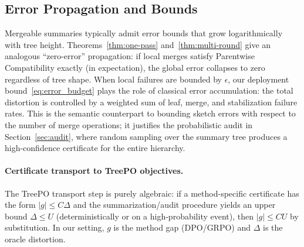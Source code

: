 \subsection{Error Propagation and Bounds}

Mergeable summaries typically admit error bounds that grow logarithmically with tree height. Theorems~\ref{thm:one-pass} and~\ref{thm:multi-round} give an analogous ``zero-error'' propagation: if local merges satisfy Parentwise Compatibility exactly (in expectation), the global error collapses to zero regardless of tree shape. When local failures are bounded by $\epsilon$, our deployment bound~\eqref{eq:error_budget} plays the role of classical error accumulation: the total distortion is controlled by a weighted sum of leaf, merge, and stabilization failure rates. This is the semantic counterpart to bounding sketch errors with respect to the number of merge operations; it justifies the probabilistic audit in Section~\ref{sec:audit}, where random sampling over the summary tree produces a high-confidence certificate for the entire hierarchy.

\paragraph{Certificate transport to TreePO objectives.}
The TreePO transport step is purely algebraic: if a method-specific certificate has the form
$|g| \le C\Delta$ and the summarization/audit procedure yields an upper bound $\Delta \le U$
(deterministically or on a high-probability event), then $|g| \le CU$ by substitution.
In our setting, $g$ is the method gap (DPO/GRPO) and $\Delta$ is the oracle distortion.

